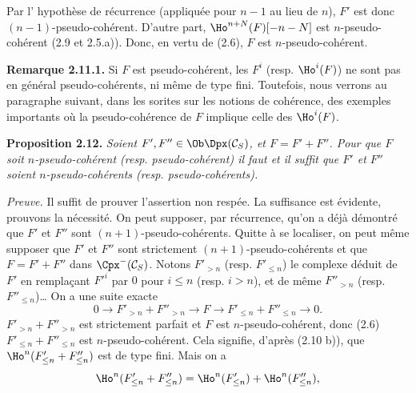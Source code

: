 Par l'%
hypothèse de récurrence (appliquée pour \(n-1\) au lieu de \(n\)), \(F'\) est donc \((n-1)\)-pseudo-cohérent. D'autre part, \(\Ho^{n+N}(F)[-n-N]\) est \(n\)-pseudo-cohérent (2.9 et 2.5.a)). Donc, en vertu de (2.6), \(F\) est \(n\)-pseudo-cohérent.

\textbf{Remarque 2.11.1.} Si \(F\) est pseudo-cohérent, les \(F^i\) (resp. \(\Ho^i(F)\)) ne sont pas en général pseudo-cohérents, ni même de type fini. Toutefois, nous verrons au paragraphe suivant, dans les sorites sur les notions de cohérence, des exemples importants où la pseudo-cohérence de \(F\) implique celle des \(\Ho^i(F)\).

\textbf{Proposition 2.12.} \emph{Soient \(F',F''\in\Ob\Dpx(\mathcal C_S)\), et \(F=F'+F''\). Pour que \(F\) soit \(n\)-pseudo-cohérent (resp. pseudo-cohérent) il faut et il suffit que \(F'\) et \(F''\) soient \(n\)-pseudo-cohérents (resp. pseudo-cohérents).}

\emph{Preuve.} Il suffit de prouver l'assertion non respée. La suffisance est évidente, prouvons la nécessité. On peut supposer, par récurrence, qu'on a déjà démontré que \(F'\) et \(F''\) sont \((n+1)\)-pseudo-cohérents. Quitte à se localiser, on peut même supposer que \(F'\) et \(F''\) sont strictement \((n+1)\)-pseudo-cohérents et que \(F=F'+F''\) dans \(\Cpx^-(\mathcal C_S)\). Notons \(F'_{>n}\) (resp. \(F'_{\leq n}\)) le complexe déduit de \(F'\) en remplaçant \(F'^i\) par \(0\) pour \(i\leq n\) (resp. \(i>n\)), et de même \(F''_{>n}\) (resp. \(F''_{\leq n}\))\dots{} On a une suite exacte
\[
  0\longrightarrow F'_{>n}+F''_{>n}\longrightarrow F
  \longrightarrow F'_{\leq n}+F''_{\leq n}\longrightarrow 0 .
\]
\(F'_{>n}+F''_{>n}\) est strictement parfait et \(F\) est \(n\)-pseudo-cohérent, donc (2.6) \(F'_{\leq n}+F''_{\leq n}\) est \(n\)-pseudo-cohérent. Cela signifie, d'après (2.10 b)), que \(\Ho^n(F'_{\leq n}+F''_{\leq n})\) est de type fini. Mais on a
\[
  \Ho^n(F'_{\leq n}+F''_{\leq n})
  =\Ho^n(F'_{\leq n})+\Ho^n(F''_{\leq n}),
\]
